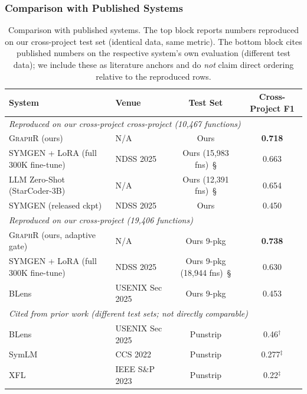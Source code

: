 \documentclass[sigconf,nonacm]{acmart}
\newcommand{\sysname}{\textsc{GraphR}}
\begin{document}
\subsubsection{Comparison with Published Systems}

\begin{table}[t]
    \centering
    \caption{Comparison with published systems. The top block reports numbers reproduced on our cross-project test set (identical data, same metric). The bottom block cites published numbers on the respective system's own evaluation (different test data); we include these as literature anchors and do \emph{not} claim direct ordering relative to the reproduced rows.}
    \label{tab:comparison}
    \scriptsize
    \setlength{\tabcolsep}{3pt}
    \begin{tabular}{llcc}
        \toprule
        \textbf{System} & \textbf{Venue} & \textbf{Test Set} & \textbf{Cross-Project F1} \\
        \midrule
        \multicolumn{4}{l}{\emph{Reproduced on our cross-project cross-project (10{,}467 functions)}} \\
        \sysname{} (ours) & N/A & Ours & \textbf{0.718} \\
        SYMGEN + LoRA (full 300K fine-tune) & NDSS 2025 & Ours (15{,}983 fns)~\S & 0.663 \\
        LLM Zero-Shot (StarCoder-3B) & N/A & Ours (12{,}391 fns)~\S & 0.654 \\
        SYMGEN (released ckpt)~\cite{symgen} & NDSS 2025 & Ours & 0.450 \\
        \midrule
        \multicolumn{4}{l}{\emph{Reproduced on our cross-project (19{,}406 functions)}} \\
        \sysname{} (ours, adaptive gate) & N/A & Ours 9-pkg & \textbf{0.738} \\
        SYMGEN + LoRA (full 300K fine-tune) & NDSS 2025 & Ours 9-pkg (18{,}944 fns)~\S & 0.630 \\
        BLens~\cite{blens} & USENIX Sec 2025 & Ours 9-pkg & 0.453 \\
        \midrule
        \multicolumn{4}{l}{\emph{Cited from prior work (different test sets; not directly comparable)}} \\
        BLens~\cite{blens} & USENIX Sec 2025 & Punstrip & 0.46$^\dagger$ \\
        SymLM~\cite{symlm} & CCS 2022 & Punstrip & 0.277$^\ddagger$ \\
        XFL~\cite{xfl} & IEEE S\&P 2023 & Punstrip & 0.22$^\ddagger$ \\

\end{tabular}
\end{table}
\end{document}
